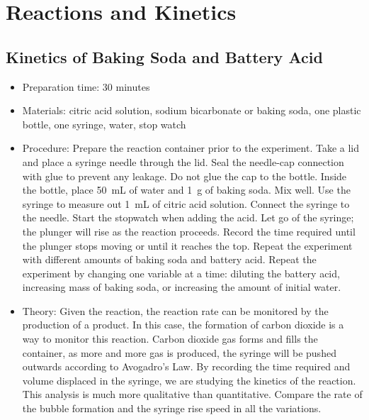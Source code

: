 \section{Reactions and Kinetics}

\subsection{Kinetics of Baking Soda and Battery Acid}
\begin{itemize}
\item{Preparation time: 30 minutes}
\item{Materials: citric acid solution, sodium bicarbonate or baking soda, one plastic bottle, one syringe, water, stop watch}
\item{Procedure: Prepare the reaction container prior to the experiment. Take a lid and place a syringe needle through the lid. Seal the needle-cap connection with glue to prevent any leakage. Do not glue the cap to the bottle. Inside the bottle, place 50~mL of water and 1~g of baking soda. Mix well. Use the syringe to measure out 1~mL of citric acid solution. Connect the syringe to the needle. Start the stopwatch when adding the acid. Let go of the syringe; the plunger will rise as the reaction proceeds. Record the time required until the plunger stops moving or until it reaches the top. Repeat the experiment with different amounts of baking soda and battery acid. Repeat the experiment by changing one variable at a time: diluting the battery acid, increasing mass of baking soda, or increasing the amount of initial water.}
\item{Theory: Given the reaction, the reaction rate can be monitored by the production of a product. In this case, the formation of carbon dioxide is a way to monitor this reaction. Carbon dioxide gas forms and fills the container, as more and more gas is produced, the syringe will be pushed outwards according to Avogadro's Law. By recording the time required and volume displaced in the syringe, we are studying the kinetics of the reaction. This analysis is much more qualitative than quantitative. Compare the rate of the bubble formation and the syringe rise speed in all the variations.}
\end{itemize}

